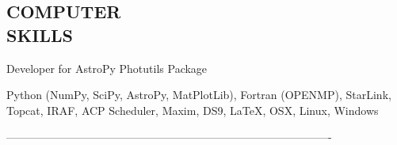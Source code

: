 \documentclass[letter, margin, 10pt]{res} %
\begin{document}
\begin{resume}
 

\section{COMPUTER \\ SKILLS}

Developer for AstroPy Photutils Package

Python (NumPy, SciPy, AstroPy, MatPlotLib), Fortran (OPENMP), StarLink, Topcat, IRAF, ACP Scheduler, Maxim, DS9, \LaTeX, OSX, Linux, Windows






 
----------------------------------------------------------------------------------------

\end{resume}
\end{document}

